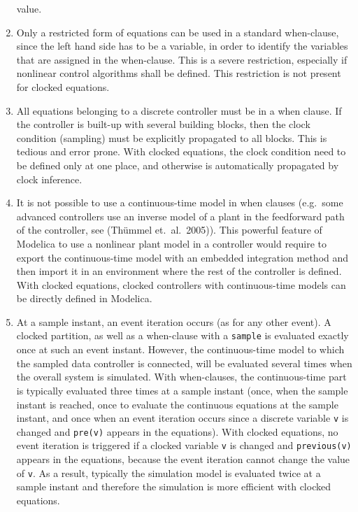 \begin{nonnormative}
\begin{enumerate}
  value.
\item
  Only a restricted form of equations can be used in a standard
  when-clause, since the left hand side has to be a variable, in order
  to identify the variables that are assigned in the when-clause. This
  is a severe restriction, especially if nonlinear control algorithms
  shall be defined. This restriction is not present for clocked
  equations.
\item
  All equations belonging to a discrete controller must be in a
  when clause. If the controller is built-up with several building
  blocks, then the clock condition (sampling) must be explicitly
  propagated to all blocks. This is tedious and error prone. With
  clocked equations, the clock condition need to be defined only at one
  place, and otherwise is automatically propagated by clock inference.
\item
  It is not possible to use a continuous-time model in when
  clauses (e.g.\ some advanced controllers use an inverse model of a
  plant in the feedforward path of the controller, see (Thümmel et.~al.\ 2005)).
  This powerful feature of Modelica to use a nonlinear plant
  model in a controller would require to export the continuous-time
  model with an embedded integration method and then import it in an
  environment where the rest of the controller is defined. With clocked
  equations, clocked controllers with continuous-time models can be
  directly defined in Modelica.
\item
  At a sample instant, an event iteration occurs (as for any other
  event). A clocked partition, as well as a when-clause with a
  \lstinline!sample! is evaluated exactly once at such an event instant.
  However, the continuous-time model to which the sampled data
  controller is connected, will be evaluated several times when the
  overall system is simulated. With when-clauses, the continuous-time
  part is typically evaluated three times at a sample instant (once,
  when the sample instant is reached, once to evaluate the continuous
  equations at the sample instant, and once when an event iteration
  occurs since a discrete variable \lstinline!v! is changed and \lstinline!pre(v)!
  appears in the equations). With clocked equations, no event iteration
  is triggered if a clocked variable \lstinline!v! is changed and
  \lstinline!previous(v)! appears in the equations, because the event
  iteration cannot change the value of \lstinline!v!. As a result, typically the
  simulation model is evaluated twice at a sample instant and therefore
  the simulation is more efficient with clocked equations.
\end{enumerate}
\end{nonnormative}

